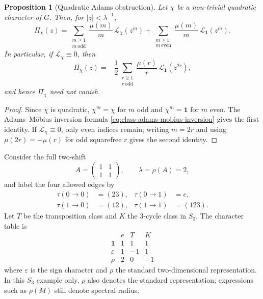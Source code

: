 \documentclass[11pt,a4paper]{amsart}
\theoremstyle{plain}
\newtheorem{proposition}[theorem]{Proposition}
\theoremstyle{definition}
\theoremstyle{remark}
\begin{document}
\begin{proposition}[Quadratic Adams obstruction]
  \label{prop:quadratic-adams-obstruction}
  Let \(\chi\) be a non-trivial quadratic character of \(G\). Then, for
  \(|z|<\lambda^{-1}\),
  \[
    \Pi_\chi(z)
    =
    \sum_{\substack{m\ge 1\\ m\ \mathrm{odd}}}
      \frac{\mu(m)}{m}\,\mathcal L_\chi(z^m)
    +
    \sum_{\substack{m\ge 1\\ m\ \mathrm{even}}}
      \frac{\mu(m)}{m}\,\mathcal L_{\mathbf 1}(z^m).
  \]
  In particular, if \(\mathcal L_\chi\equiv0\), then
  \[
    \Pi_\chi(z)
    =
    -\frac{1}{2}
      \sum_{\substack{r\ge 1\\ r\ \mathrm{odd}}}
        \frac{\mu(r)}{r}\,
        \mathcal L_{\mathbf 1}(z^{2r}),
  \]
  and hence \(\Pi_\chi\) need not vanish.
\end{proposition}

\begin{proof}
  Since \(\chi\) is quadratic, \(\chi^m=\chi\) for \(m\) odd and
  \(\chi^m=\mathbf1\) for \(m\) even. The Adams--M\"obius inversion
  formula \eqref{eq:class-adams-mobius-inversion} gives the first
  identity. If \(\mathcal L_\chi\equiv0\), only even indices remain;
  writing \(m=2r\) and using \(\mu(2r)=-\mu(r)\) for odd squarefree
  \(r\) gives the second identity.
\end{proof}

Consider the full two-shift
\[
  A=
  \begin{pmatrix}
    1 & 1 \\
    1 & 1
  \end{pmatrix},
  \qquad
  \lambda=\rho(A)=2,
\]
and label the four allowed edges by
\begin{equation}\label{eq:s3-example-edge-labels}
  \begin{aligned}
    \tau(0\to 0)&=(23), & \tau(0\to 1)&=e, \\
    \tau(1\to 0)&=(12), & \tau(1\to 1)&=(123).
  \end{aligned}
\end{equation}
Let \(T\) be the transposition class and \(K\) the \(3\)-cycle class in
\(S_3\). The character table is
\begin{equation}\label{eq:s3-character-table}
  \begin{array}{c|ccc}
    & e & T & K \\ \hline
    \mathbf 1 & 1 & 1 & 1 \\
    \varepsilon & 1 & -1 & 1 \\
    \rho & 2 & 0 & -1
  \end{array}
\end{equation}
where \(\varepsilon\) is the sign character and \(\rho\) the standard
two-dimensional representation. In this \(S_3\) example only, \(\rho\)
also denotes the standard representation; expressions such as
\(\rho(M)\) still denote spectral radius.
\end{document}
